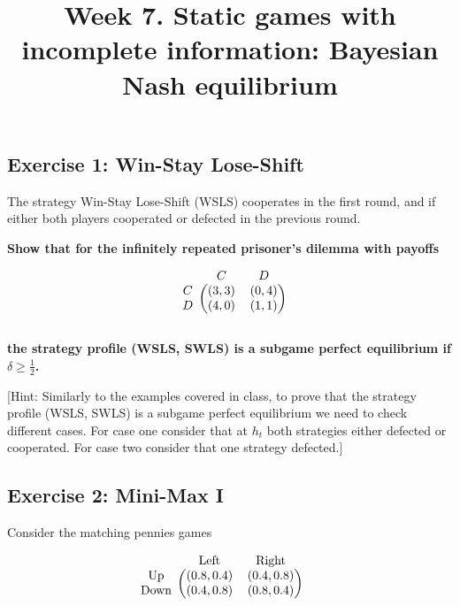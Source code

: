 \documentclass[10pt]{article}
\title{\textbf{Week 7.} Static games with incomplete information: Bayesian Nash equilibrium}
\date{}
\begin{document}
\maketitle

\subsection*{Exercise 1: Win-Stay Lose-Shift}

The strategy Win-Stay Lose-Shift (WSLS) cooperates in the first round, and if
either both players cooperated or defected in the previous round.

\textbf{Show that for the infinitely repeated prisoner's dilemma with payoffs}

\begin{equation*}
    \begin{blockarray}{ccc}
        & C & D \\
        \begin{block}{c(cc)}
            C & (3, 3) & (0, 4) \\
            D & (4, 0) & (1, 1) \\
        \end{block}
    \end{blockarray}
\end{equation*}

\textbf{the strategy profile (WSLS, SWLS) is a subgame perfect equilibrium if
\(\delta \geq \frac{1}{2}\).}

[Hint: Similarly to the examples covered in class, to prove that the strategy
profile (WSLS, SWLS) is a subgame perfect equilibrium we need to check different
cases. For case one consider that at $h_t$ both strategies either defected or
cooperated. For case two consider that one strategy defected.]

\subsection*{Exercise 2: Mini-Max I}

Consider the matching pennies games

\begin{equation*}
    \begin{blockarray}{ccc}
        & \text{Left} & \text{Right} \\
        \begin{block}{c(cc)}
            \text{Up} &    (0.8, 0.4) & (0.4, 0.8) \\
            \text{Down} & (0.4, 0.8) & (0.8, 0.4) \\
        \end{block}
    \end{blockarray}\qquad
    \end{equation*}
\end{document}

